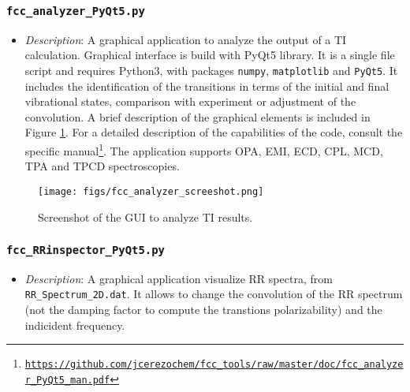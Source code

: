 \documentclass[a4paper,11pt]{article}
\begin{document}
\subsubsection{\texttt{fcc\_analyzer\_PyQt5.py}}
\begin{itemize}
 \item[] \textit{Description}:
 A graphical application to analyze the output of a TI calculation. Graphical interface is build with PyQt5 library. It is a single file script and requires Python3, with packages \texttt{numpy}, \texttt{matplotlib} and \texttt{PyQt5}. It includes the identification of the transitions in terms of the initial and final vibrational states, comparison with experiment or adjustment of the convolution. A brief description of the graphical elements is included in Figure \ref{F:fcc_analyzer}. For a detailed description of the capabilities of the code, consult the specific manual\footnote{\href{https://github.com/jcerezochem/fcc_tools/raw/master/doc/fcc_analyzer_PyQt5_man.pdf}{\texttt{https://github.com/jcerezochem/fcc\_tools/raw/master/doc/fcc\_analyzer\_PyQt5\_man.pdf}}}. The application supports OPA, EMI, ECD, CPL, MCD, TPA and TPCD spectroscopies.
\end{itemize}


\begin{figure}[h!]
\begin{center}
 \texttt{[image: figs/fcc\_analyzer\_screeshot.png]}
\end{center}
 \caption{Screenshot of the GUI to analyze TI results.}
\label{F:fcc_analyzer}
\end{figure}

\subsubsection{\texttt{fcc\_RRinspector\_PyQt5.py}}
\begin{itemize}
 \item[] \textit{Description}:
 A graphical application visualize RR spectra, from \texttt{RR\_Spectrum\_2D.dat}. It allows to change the convolution of the RR spectrum (not the damping factor to compute the transtions polarizability) and the indicident frequency.
\end{itemize}
\end{document}
